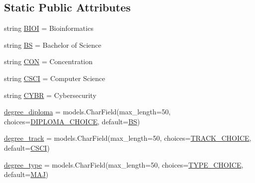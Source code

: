 \subsection*{Static Public Attributes}
\begin{DoxyCompactItemize}
\item 
string \mbox{\hyperlink{classlanding_1_1models_1_1Degree_afc3f658c11fb395b63ec02dea12d73ff}{B\+I\+OI}} = \textquotesingle{}Bioinformatics\textquotesingle{}
\item 
string \mbox{\hyperlink{classlanding_1_1models_1_1Degree_a22b6e40d619611a02ecd1750b0cfcd22}{BS}} = \textquotesingle{}Bachelor of Science\textquotesingle{}
\item 
string \mbox{\hyperlink{classlanding_1_1models_1_1Degree_a648e73a8b3abcfe249775ca0e0902a46}{C\+ON}} = \textquotesingle{}Concentration\textquotesingle{}
\item 
string \mbox{\hyperlink{classlanding_1_1models_1_1Degree_a818c1f18f64c3529a2bfcb746efb6600}{C\+S\+CI}} = \textquotesingle{}Computer Science\textquotesingle{}
\item 
string \mbox{\hyperlink{classlanding_1_1models_1_1Degree_a6ce9e89d5029462e65272bc7b145d4dd}{C\+Y\+BR}} = \textquotesingle{}Cybersecurity\textquotesingle{}
\item 
\mbox{\hyperlink{classlanding_1_1models_1_1Degree_abe092b826ebd50d242cf880ca10e127b}{degree\+\_\+diploma}} = models.\+Char\+Field(max\+\_\+length=50, choices=\mbox{\hyperlink{classlanding_1_1models_1_1Degree_a7972b49cb5153c95f5a5d509de3b1135}{D\+I\+P\+L\+O\+M\+A\+\_\+\+C\+H\+O\+I\+CE}}, default=\mbox{\hyperlink{classlanding_1_1models_1_1Degree_a22b6e40d619611a02ecd1750b0cfcd22}{BS}})
\item 
\mbox{\hyperlink{classlanding_1_1models_1_1Degree_a5dbec6bcca9df5d74244218ef8e75a5b}{degree\+\_\+track}} = models.\+Char\+Field(max\+\_\+length=50, choices=\mbox{\hyperlink{classlanding_1_1models_1_1Degree_a63995a5c2aa1f03f1328238ebbd7ecd2}{T\+R\+A\+C\+K\+\_\+\+C\+H\+O\+I\+CE}}, default=\mbox{\hyperlink{classlanding_1_1models_1_1Degree_a818c1f18f64c3529a2bfcb746efb6600}{C\+S\+CI}})
\item 
\mbox{\hyperlink{classlanding_1_1models_1_1Degree_a15ee92cd794ad8c2dabf965723cfd949}{degree\+\_\+type}} = models.\+Char\+Field(max\+\_\+length=50, choices=\mbox{\hyperlink{classlanding_1_1models_1_1Degree_a2e0c65757b0f59ed5c62ee8b2d517300}{T\+Y\+P\+E\+\_\+\+C\+H\+O\+I\+CE}}, default=\mbox{\hyperlink{classlanding_1_1models_1_1Degree_ad19df1851aacc963e0bc67c2a7097aec}{M\+AJ}})
\item 

\end{DoxyCompactItemize}
